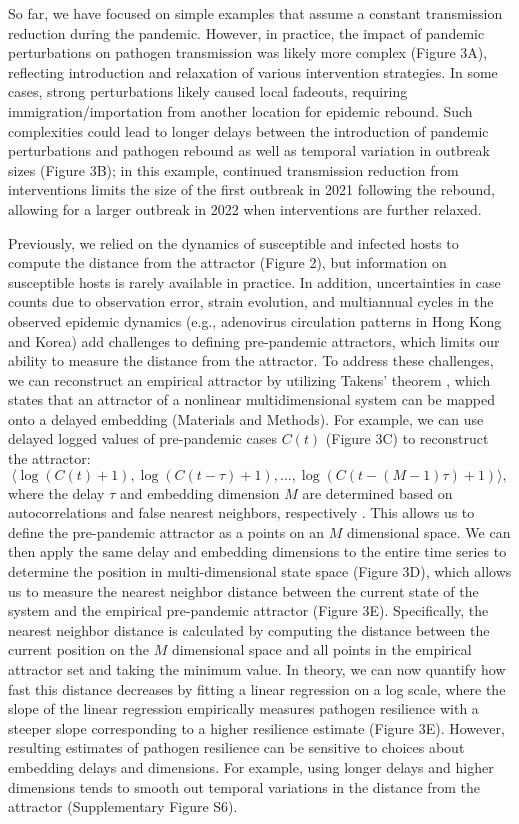\documentclass[12pt]{article}
\begin{document}
So far, we have focused on simple examples that assume a constant transmission reduction during the pandemic.
However, in practice, the impact of pandemic perturbations on pathogen transmission was likely more complex (Figure 3A), reflecting introduction and relaxation of various intervention strategies.
In some cases, strong perturbations likely caused local fadeouts, requiring immigration/importation from another location for epidemic rebound.
Such complexities could lead to longer delays between the introduction of pandemic perturbations and pathogen rebound as well as temporal variation in outbreak sizes (Figure 3B);
in this example, continued transmission reduction from interventions limits the size of the first outbreak in 2021 following the rebound, allowing for a larger outbreak in 2022 when interventions are further relaxed.

Previously, we relied on the dynamics of susceptible and infected hosts to compute the distance from the attractor (Figure 2), but information on susceptible hosts is rarely available in practice.
In addition, uncertainties in case counts due to observation error, strain evolution, and multiannual cycles in the observed epidemic dynamics (e.g., adenovirus circulation patterns in Hong Kong and Korea) add challenges to defining pre-pandemic attractors, which limits our ability to measure the distance from the attractor.
To address these challenges, we can reconstruct an empirical attractor by utilizing Takens' theorem \citep{takens2006detecting}, which states that an attractor of a nonlinear multidimensional system can be mapped onto a delayed embedding (Materials and Methods).
For example, we can use delayed logged values of pre-pandemic cases $C(t)$ (Figure 3C) to reconstruct the attractor:
\begin{equation}
\langle\log(C(t)+1), \log(C(t-\tau)+1), \dots, \log(C(t-(M-1)\tau)+1)\rangle,
\end{equation}
where the delay $\tau$ and embedding dimension $M$ are determined based on autocorrelations and false nearest neighbors, respectively \citep{kennel1992determining,tan2023selecting}.
This allows us to define the pre-pandemic attractor as a points on an $M$ dimensional space.
We can then apply the same delay and embedding dimensions to the entire time series to determine the position in multi-dimensional state space (Figure 3D), which allows us to measure the nearest neighbor distance between the current state of the system and the empirical pre-pandemic attractor (Figure 3E).
Specifically, the nearest neighbor distance is calculated by computing the distance between the current position on the $M$ dimensional space and all points in the empirical attractor set and taking the minimum value.
In theory, we can now quantify how fast this distance decreases by fitting a linear regression on a log scale, where the slope of the linear regression empirically measures pathogen resilience with a steeper slope corresponding to a higher resilience estimate (Figure 3E).
However, resulting estimates of pathogen resilience can be sensitive to choices about embedding delays and dimensions.
For example, using longer delays and higher dimensions tends to smooth out temporal variations in the distance from the attractor (Supplementary Figure S6).
\end{document}

